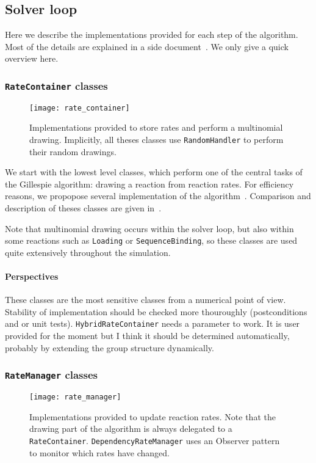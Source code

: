 \subsection{Solver loop}

Here we describe the implementations provided for each step of the algorithm. Most of the details are explained in a side document~\citep{cati}. We only give a quick overview here.

\subsubsection{\texttt{RateContainer} classes}

\begin{figure}[!h]
  \centering
  \texttt{[image: rate\_container]}
  \caption{Implementations provided to store rates and perform a multinomial drawing. Implicitly, all theses classes use \texttt{RandomHandler} to perform their random drawings. }
  \label{fig:rate_container}
\end{figure}

We start with the lowest level classes, which perform one of the central tasks of the Gillespie algorithm: drawing a reaction from reaction rates. For efficiency reasons, we propopose several implementation of the algorithm~. Comparison and description of theses classes are given in~\citet{cati}. 

Note that multinomial drawing occurs within the solver loop, but also within some reactions such as \texttt{Loading} or \texttt{SequenceBinding}, so these classes are used quite extensively throughout the simulation.

\paragraph{Perspectives} These classes are the most sensitive classes from a numerical point of view. Stability of implementation should be checked more thouroughly (postconditions and or unit tests). \texttt{HybridRateContainer} needs a parameter to work. It is user provided for the moment but I think it should be determined automatically, probably by extending the group structure dynamically.

\subsubsection{\texttt{RateManager} classes}

\begin{figure}[!h]
  \centering
  \texttt{[image: rate\_manager]}
  \caption{Implementations provided to update reaction rates. Note that the drawing part of the algorithm is always delegated to a \texttt{RateContainer}. \texttt{DependencyRateManager} uses an Observer pattern to monitor which rates have changed.}
  \label{fig:rate_manager}
\end{figure}

